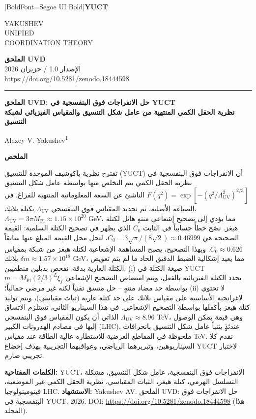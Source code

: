 \documentclass[11pt,a4paper]{article}
\newcommand{\Mpl}{M_{\mathrm{Pl}}}
\newcommand{\LUV}{\Lambda_{\mathrm{UV}}}
\theoremstyle{remark}
\newcommand{\makeheader}{%
	\noindent
	\begin{minipage}{0.17\textwidth}
		\raggedright
		{\fontspec{Segoe UI}[BoldFont=Segoe UI Bold]\bfseries\color{skyblue}\fontsize{46}{46}\selectfont YUCT}%
	\end{minipage}%
	\hspace{30pt}
	\begin{minipage}{0.32\textwidth}
		\raggedright
		{\sffamily\fontsize{11}{13}\selectfont YAKUSHEV\\ UNIFIED\\ COORDINATION THEORY}%
	\end{minipage}%
	\hfill
	\begin{minipage}{0.38\textwidth}
		\raggedleft
		{\sffamily\bfseries الملحق UVD}\\ 
		{\sffamily الإصدار 1.0 / حزيران 2026}\\ 
		{\sffamily\footnotesize \url{https://doi.org/10.5281/zenodo.18444598}}%
	\end{minipage}
	\par\vspace{5pt}
	\noindent\textcolor{gold}{\rule{\textwidth}{1.6pt}}
	\par\vspace{0pt}
}
\begin{document}
	\thispagestyle{firstpage}
	\makeheader
	
	\begin{otherlanguage}{arabic}
		\vspace{0.5cm}
		{\LARGE\bfseries الملحق UVD: حل الانفراجات فوق البنفسجية في YUCT \\
			\Large نظرية الحقل الكمي المنتهية من عامل شكل التنسيق والمقياس الفيزيائي لشبكة التنسيق \par}
		\vspace{0.3cm}
		
		{\large Alexey V. Yakushev\textsuperscript{1}} \\
		\vspace{0.2cm}
		
		{\color{darkblue}\textbf{\LARGE الملخص}} \par
		{\large
			\noindent
			تقترح نظرية ياكوشيف الموحدة للتنسيق (YUCT) أن الانفراجات فوق البنفسجية في نظرية الحقل الكمي يتم التخلص منها بواسطة عامل شكل التنسيق \(F(q^2) = \exp[-(q^2/\LUV^2)^{2/3}]\) الناشئ عن السعة المعلوماتية المنتهية للفراغ. في الصياغة الأصلية، تم تحديد المقياس فوق البنفسجي \(\LUV\) بكتلة بلانك، \(\LUV = 3\pi\Mpl \approx 1.15\times 10^{20}\) GeV، مما يؤدي إلى تصحيح إشعاعي منتهٍ هائل لكتلة هيغز. نصّح خطأً حسابياً في الثابت \(C_0\) الذي يظهر في تصحيح الكتلة السلمية: القيمة الصحيحة هي \(C_0 = 3\sqrt{\pi}/(8\sqrt{2}) \approx 0.46999\)، لتحل محل القيمة المبلغ عنها سابقاً \(C_0 \approx 0.626\). وبهذا التصحيح، يصبح المساهمة الإشعاعية لكتلة هيغز من شبكة بمقياس بلانك \(\delta m \approx 1.57\times 10^{18}\) GeV، مما يعيد إشكالية الضبط الدقيق الحاد ما لم يتم تعويض الكتلة العارية بدقة. نفحص بديلين منطقيين: (i) صيغة الكتلة في YUCT \(m = \Mpl(2/3)^L\xi_f\) تحدد الكتلة الفيزيائية بالفعل، ويتم امتصاص التصحيح الإشعاعي بواسطة حد مضاد منتهٍ – حل متسق تقنياً لكنه غير مرضي جمالياً؛ (ii) لا تحتوي لاغرانجية الأساسية على مقياس بلانك على حد كتلة عارية (ثبات مقياسي)، ويتم توليد كتلة هيغز بأكملها بواسطة التصحيح الإشعاعي. في هذا السيناريو الثاني، تستلزم الاتساق الذاتي أن يكون المقياس فوق البنفسجي \(\LUV \approx 8.96\) TeV، وهي قيمة يمكن الوصول إليها في مصادم الهدرونات الكبير (LHC). عندئذٍ يتنبأ عامل شكل التنسيق بانحرافات ملحوظة في المقاطع العرضية للاستطارة عالية الطاقة عند مقياس TeV. نقدم كلا السيناريوهين، وتبريرهما الرياضي، وعواقبهما التجريبية بهدف إخضاع YUCT لاختبار تجريبي صارم.
		}
		
		\vspace{0.2cm}
		\noindent
		{\color{darkblue}\textbf{الكلمات المفتاحية:}} YUCT، الانفراجات فوق البنفسجية، عامل شكل التنسيق، مشكلة التسلسل الهرمي، كتلة هيغز، الثبات المقياسي، نظرية الحقل الكمي غير الموضعية، فينومينولوجيا LHC.
		\vspace{0.1cm}
		\noindent
		{\color{darkblue}\textbf{الاستشهاد:}} Yakushev AV. الملحق UVD: حل الانفراجات فوق البنفسجية في YUCT. 2026. DOI: \url{https://doi.org/10.5281/zenodo.18444598} (هذا المجلد).
		

\end{otherlanguage}
\end{document}
